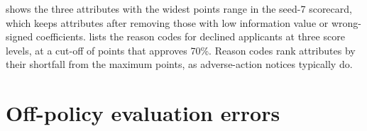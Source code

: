 \documentclass[10pt]{article}
\begin{document}
 shows the three attributes with the widest points range in the seed-7 scorecard, which keeps \EfiveNfeat{} attributes after removing those with low information value or wrong-signed coefficients.  lists the reason codes for declined applicants at three score levels, at a cut-off of \EfiveCut{} points that approves 70\%. Reason codes rank attributes by their shortfall from the maximum points, as adverse-action notices typically do.

\begin{table}[H]
\centering\small
\caption{Excerpt of the WoE scorecard (seed 7). Points are scaled to 600 at odds of 50:1 with 20 points to double the odds.}
\label{tab:scorecard}

\end{table}

\begin{table}[H]
\centering\small
\caption{Reason codes for declined applicants (seed 7).}
\label{tab:reasons}

\end{table}

\section{Off-policy evaluation errors}\label{app:ope}

\begin{table}[H]
\centering\small
\caption{Errors of off-policy estimates of recovery value over eight policies and five seeds (\RfourNpoints{} estimates per estimator), in percentage points of balance.}
\label{tab:r4}

\end{table}
\end{document}
